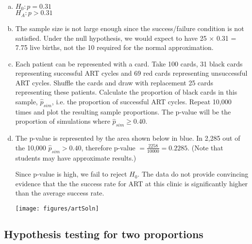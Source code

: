 {
\begin{enumerate}[(a)]
\item $H_0: p = 0.31$ \\
$H_A: p > 0.31$
\item The sample size is not large enough since the success/failure condition is not satisfied. Under the null hypothesis, we would expect to have 25 $\times$ 0.31 = 7.75 
live births, not the 10 required for the normal approximation.
\item Each patient can be represented with a card. Take 100 cards, 31 black cards representing successful ART cycles and 69 red cards representing unsuccessful ART cycles. Shuffle the cards and draw with replacement 25 cards representing these patients. Calculate the proportion of black cards in this sample, $\hat{p}_{sim}$, i.e. the proportion of successful ART cycles. Repeat 10,000 times and plot the resulting sample proportions. The p-value will be the proportion of simulations where $\hat{p}_{sim} \ge 0.40$.
\item The p-value is represented by the area shown below in blue. In 2,285 out of the 10,000 $\hat{p}_{sim} > 0.40$, therefore p-value $= \frac{2258}{10000} = 0.2285$. (Note that students may have approximate results.) 

\noindent \begin{minipage}[c]{0.5\textwidth}
Since p-value is high, we fail to reject $H_0$. The data do not provide convincing evidence that the the success rate for ART at this clinic is significantly higher than the average success rate.
\end{minipage}
\begin{minipage}[c]{0.5\textwidth}
\begin{center}
\texttt{[image: figures/artSoln]}
\end{center}
\end{minipage}
\end{enumerate}
}


\pagebreak
\subsection{Hypothesis testing for two proportions}



